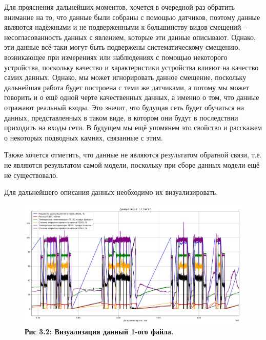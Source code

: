 {  \par \redline Для прояснения дальнейших моментов, хочется в очередной раз обратить внимание на то, что данные были собраны с помощью датчиков, поэтому данные являются надёжными и не подверженными к большинству видов смещений – несогласованность данных с явлением, которые эти данные описывают.  Однако, эти данные всё-таки могут быть подвержены систематическому смещению, возникающее при измерениях или наблюдениях с помощью некоторого устройства, поскольку качество и характеристики устройства влияют на качество самих данных. Однако, мы может игнорировать данное смещение, поскольку дальнейшая работа будет построена с теми же датчиками, а потому мы может говорить и о ещё одной черте качественных данных, а именно о том, что данные отражают реальный входы. Это значит, что будущая сеть будет обучаться на данных, представленных в таком виде, в котором они будут в последствии приходить на входы сети. В будущем мы ещё упомянем это свойство и расскажем о некоторых подводных камнях, связанные с этим.

  \par \redline Также хочется отметить, что данные не являются результатом обратной связи, т.е. не являются результатом самой модели, поскольку при сборе данных модели ещё не существовало.

  \par \redline Для дальнейшего описания данных необходимо их визуализировать.

  \begin{figure}
    \centering
    \def\svgwidth{\textwidth}
    \includegraphics[width=\textwidth]{images/data_1_visual.jpg}
    \caption{\bfseries Рис 3.2: Визуализация данный 1-ого файла.}
    \label{fig:NNBlackBox}
  \end{figure}

}
